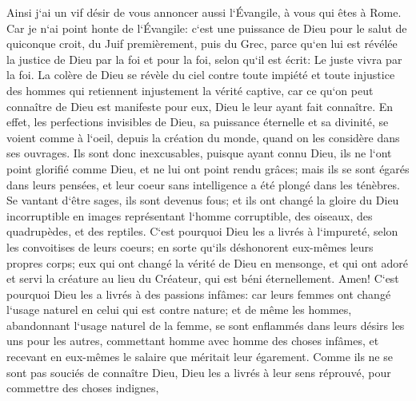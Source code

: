 \verse Ainsi j`ai un vif désir de vous annoncer aussi l`Évangile, à vous qui êtes à Rome. 
\verse Car je n`ai point honte de l`Évangile: c`est une puissance de Dieu pour le salut de quiconque croit, du Juif premièrement, puis du Grec, 
\verse parce qu`en lui est révélée la justice de Dieu par la foi et pour la foi, selon qu`il est écrit: Le juste vivra par la foi. 
\verse La colère de Dieu se révèle du ciel contre toute impiété et toute injustice des hommes qui retiennent injustement la vérité captive, 
\verse car ce qu`on peut connaître de Dieu est manifeste pour eux, Dieu le leur ayant fait connaître. 
\verse En effet, les perfections invisibles de Dieu, sa puissance éternelle et sa divinité, se voient comme à l`oeil, depuis la création du monde, quand on les considère dans ses ouvrages. Ils sont donc inexcusables, 
\verse puisque ayant connu Dieu, ils ne l`ont point glorifié comme Dieu, et ne lui ont point rendu grâces; mais ils se sont égarés dans leurs pensées, et leur coeur sans intelligence a été plongé dans les ténèbres. 
\verse Se vantant d`être sages, ils sont devenus fous; 
\verse et ils ont changé la gloire du Dieu incorruptible en images représentant l`homme corruptible, des oiseaux, des quadrupèdes, et des reptiles. 
\verse C`est pourquoi Dieu les a livrés à l`impureté, selon les convoitises de leurs coeurs; en sorte qu`ils déshonorent eux-mêmes leurs propres corps; 
\verse eux qui ont changé la vérité de Dieu en mensonge, et qui ont adoré et servi la créature au lieu du Créateur, qui est béni éternellement. Amen! 
\verse C`est pourquoi Dieu les a livrés à des passions infâmes: car leurs femmes ont changé l`usage naturel en celui qui est contre nature; 
\verse et de même les hommes, abandonnant l`usage naturel de la femme, se sont enflammés dans leurs désirs les uns pour les autres, commettant homme avec homme des choses infâmes, et recevant en eux-mêmes le salaire que méritait leur égarement. 
\verse Comme ils ne se sont pas souciés de connaître Dieu, Dieu les a livrés à leur sens réprouvé, pour commettre des choses indignes, 
